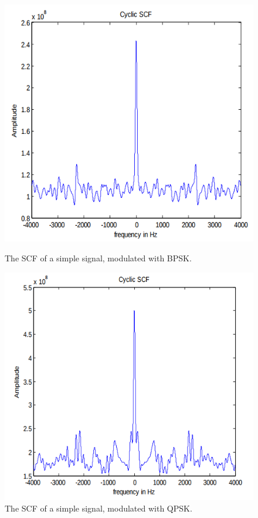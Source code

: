 \begin{figure}[ht!]
\begin{minipage}{.5\textwidth}
  \centering
\includegraphics[scale=0.4]{img/cyclic_scf_bpsk.png}
\caption{The SCF of a simple signal, modulated with BPSK.}
\label{fig:cyclic_scf_bpsk}
\end{minipage}
\begin{minipage}{0.5\textwidth}
\centering
\includegraphics[scale=0.4]{img/cyclic_scf_qpsk.png}
\caption{The SCF of a simple signal, modulated with QPSK.}
\label{fig:cyclic_scf_qpsk}
\end{minipage}
\end{figure}

